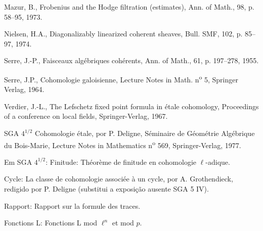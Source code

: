 \begin{enumerate}[label={[\arabic*]},leftmargin=3.5em]
\item Mazur, B., Frobenius and the Hodge filtration (estimates), Ann. of Math., 98, p. 58--95, 1973.
\item Nielsen, H.A., Diagonalizably linearized coherent sheaves, Bull. SMF, 102, p. 85--97, 1974.
\item Serre, J.-P., Faisceaux algébriques cohérents, Ann. of Math., 61, p. 197--278, 1955.
\item Serre, J.P., Cohomologie galoisienne, Lecture Notes in Math. n\textsuperscript{o} 5, Springer Verlag, 1964.
\item Verdier, J.-L., The Lefschetz fixed point formula in étale cohomology, Proceedings of a conference on local fields, Springer-Verlag, 1967.
\end{enumerate}

SGA $4^{1/2}$ Cohomologie étale, por P. Deligne, Séminaire de Géométrie Algébrique du Bois-Marie, Lecture Notes in Mathematics n\textsuperscript{o} 569, Springer-Verlag, 1977.

Em SGA $4^{1/2}$: Finitude: Théorème de finitude en cohomologie $\ell$-adique.

Cycle: La classe de cohomologie associée à un cycle, por A. Grothendieck, redigido por P. Deligne (substitui a exposição ausente SGA 5 IV).

Rapport: Rapport sur la formule des traces.

Fonctions L: Fonctions L mod $\ell^n$ et mod $p$.

\clearpage
